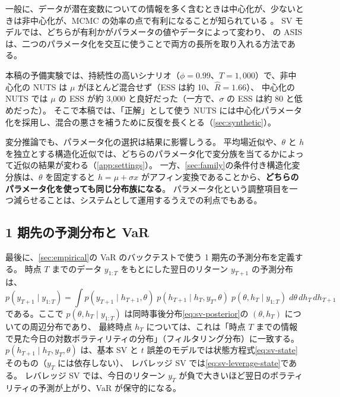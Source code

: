 一般に、データが潜在変数についての情報を多く含むときは中心化が、少ないときは非中心化が、MCMC の効率の点で有利になることが知られている \parencite{papaspiliopoulos2007}。
SV モデルでは、どちらが有利かがパラメータの値やデータによって変わり、
\textcite{kastner2014} の ASIS は、二つのパラメータ化を交互に使うことで両方の長所を取り入れる方法である。

本稿の予備実験では、持続性の高いシナリオ（$\phi = 0.99$、$T = 1{,}000$）で、非中心化の NUTS は $\mu$ がほとんど混合せず（ESS は約 10、$\hat R = 1.66$）、
中心化の NUTS では $\mu$ の ESS が約 3,000 と良好だった（一方で、$\sigma$ の ESS は約 80 と低めだった）。
そこで本稿では、「正解」として使う NUTS には中心化パラメータ化を採用し、混合の悪さを補うために反復を長くとる（\cref{sec:synthetic}）。

変分推論でも、パラメータ化の選択は結果に影響しうる。
平均場近似や、$\theta$ と $h$ を独立とする構造化近似では、どちらのパラメータ化で変分族を当てるかによって近似の結果が変わる（\cref{app:settings}）。
一方、\cref{sec:family}の条件付き構造化変分族は、$\theta$ を固定すると $h = \mu + \sigma x$ がアフィン変換であることから、\textbf{どちらのパラメータ化を使っても同じ分布族になる}。
パラメータ化という調整項目を一つ減らせることは、システムとして運用するうえでの利点でもある。

\subsection{1 期先の予測分布と VaR}\label{sec:model-predictive}

最後に、\cref{sec:empirical}の VaR のバックテストで使う 1 期先の予測分布を定義する。
時点 $T$ までのデータ $y_{1:T}$ をもとにした翌日のリターン $y_{T+1}$ の予測分布は、
\begin{equation}
  p(y_{T+1} \mid y_{1:T}) = \int p(y_{T+1} \mid h_{T+1}, \theta)\; p(h_{T+1} \mid h_T, y_T, \theta)\; p(\theta, h_T \mid y_{1:T})\; d\theta\, dh_T\, dh_{T+1}
  \label{eq:predictive}
\end{equation}
である。ここで $p(\theta, h_T \mid y_{1:T})$ は同時事後分布\cref{eq:sv-posterior}の $(\theta, h_T)$ についての周辺分布であり、
最終時点 $h_T$ については、これは「時点 $T$ までの情報で見た今日の対数ボラティリティの分布」（フィルタリング分布）に一致する。
$p(h_{T+1} \mid h_T, y_T, \theta)$ は、基本 SV と $t$ 誤差のモデルでは状態方程式\cref{eq:sv-state}そのもの（$y_T$ には依存しない）、
レバレッジ SV では\cref{eq:sv-leverage-state}である。
レバレッジ SV では、今日のリターン $y_T$ が負で大きいほど翌日のボラティリティの予測が上がり、VaR が保守的になる。

